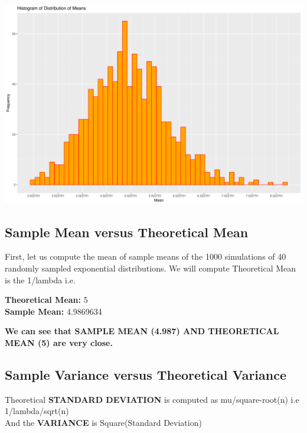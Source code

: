\documentclass[]{article}
\newenvironment{Shaded}{\begin{snugshade}}{\end{snugshade}}
\newcommand{\KeywordTok}[1]{\textcolor[rgb]{0.13,0.29,0.53}{\textbf{{#1}}}}
\newcommand{\DecValTok}[1]{\textcolor[rgb]{0.00,0.00,0.81}{{#1}}}
\newcommand{\StringTok}[1]{\textcolor[rgb]{0.31,0.60,0.02}{{#1}}}
\newcommand{\NormalTok}[1]{{#1}}
\begin{document}
\includegraphics{Statistical_Inference_Project_1_files/figure-latex/unnamed-chunk-1-1.pdf}

\subsection{Sample Mean versus Theoretical
Mean}\label{sample-mean-versus-theoretical-mean}

First, let us compute the mean of sample means of the 1000 simulations
of 40 randomly sampled exponential distributions. We will compute
Theoretical Mean is the 1/lambda i.e.

\begin{Shaded}
\end{Shaded}

\textbf{Theoretical Mean:} 5\\
\textbf{Sample Mean:} 4.9869634

\textbf{We can see that SAMPLE MEAN (4.987) AND THEORETICAL MEAN (5) are
very close.}

\subsection{Sample Variance versus Theoretical
Variance}\label{sample-variance-versus-theoretical-variance}

Theoretical \textbf{STANDARD DEVIATION} is computed as mu/square-root(n)
i.e 1/lambda/sqrt(n)\\
And the \textbf{VARIANCE} is Square(Standard Deviation)
\end{document}

